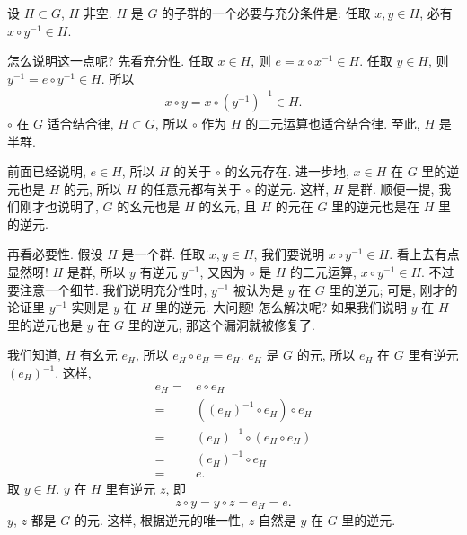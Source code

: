 \begin{remark}
    设 $H \subset G$, $H$ 非空. $H$ 是 $G$ 的子群的一个必要与充分条件是: 任取 $x,y \in H$, 必有 $x \circ y^{-1} \in H$.

    怎么说明这一点呢? 先看充分性. 任取 $x \in H$, 则 $e = x \circ x^{-1} \in H$. 任取 $y \in H$, 则 $y^{-1} = e \circ y^{-1} \in H$. 所以
    \begin{align*}
        x \circ y = x \circ (y^{-1})^{-1} \in H.
    \end{align*}
    $\circ$ 在 $G$ 适合结合律, $H \subset G$, 所以 $\circ$ 作为 $H$ 的二元运算也适合结合律. 至此, $H$ 是半群.

    前面已经说明, $e \in H$, 所以 $H$ 的关于 $\circ$ 的幺元存在. 进一步地, $x \in H$ 在 $G$ 里的逆元也是 $H$ 的元, 所以 $H$ 的任意元都有关于 $\circ$ 的逆元. 这样, $H$ 是群. 顺便一提, 我们刚才也说明了, $G$ 的幺元也是 $H$ 的幺元, 且 $H$ 的元在 $G$ 里的逆元也是在 $H$ 里的逆元.

    再看必要性. 假设 $H$ 是一个群. 任取 $x,y \in H$, 我们要说明 $x \circ y^{-1} \in H$. 看上去有点显然呀! $H$ 是群, 所以 $y$ 有逆元 $y^{-1}$, 又因为 $\circ$ 是 $H$ 的二元运算, $x \circ y^{-1} \in H$. 不过要注意一个细节. 我们说明充分性时, $y^{-1}$ 被认为是 $y$ 在 $G$ 里的逆元; 可是, 刚才的论证里 $y^{-1}$ 实则是 $y$ 在 $H$ 里的逆元. 大问题! 怎么解决呢? 如果我们说明 $y$ 在 $H$ 里的逆元也是 $y$ 在 $G$ 里的逆元, 那这个漏洞就被修复了.

    我们知道, $H$ 有幺元 $e_H$, 所以 $e_H \circ e_H = e_H$. $e_H$ 是 $G$ 的元, 所以 $e_H$ 在 $G$ 里有逆元 $(e_H)^{-1}$. 这样,
    \begin{align*}
        e_H
        = {} & e \circ e_H                      \\
        = {} & ((e_H)^{-1} \circ e_H) \circ e_H \\
        = {} & (e_H)^{-1} \circ (e_H \circ e_H) \\
        = {} & (e_H)^{-1} \circ e_H             \\
        = {} & e.
    \end{align*}
    取 $y \in H$. $y$ 在 $H$ 里有逆元 $z$, 即
    \begin{align*}
        z \circ y = y \circ z = e_H = e.
    \end{align*}
    $y$, $z$ 都是 $G$ 的元. 这样, 根据逆元的唯一性, $z$ 自然是 $y$ 在 $G$ 里的逆元.
\end{remark}

\subsubsection*{\AdditiveGroups}

